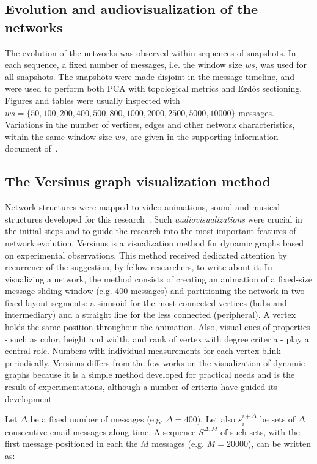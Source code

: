 \subsection{Evolution and audiovisualization of the networks}\label{sec:viz}
The evolution of the networks was observed within 
sequences of snapshots. In each sequence, a fixed number of messages,
i.e. the window size $ws$, was used for all snapshots.
The snapshots were made disjoint in the message timeline, and were used to perform both PCA with topological metrics and Erd\"os sectioning. 
Figures and tables were usually inspected with 
$ws=\{50, 100, 200, 400, 500, 800, 1000, 2000, 2500, 5000, 10000\}$ messages. Variations in the number of vertices, edges
and other network characteristics, within the same window size $ws$,
are given in the supporting information document of~\cite{stab}. 

\subsection{The Versinus graph visualization method}
Network structures were mapped to video animations, sound and musical structures developed for this research~\cite{animacoes}.%
Such \emph{audiovisualizations} were crucial in the initial steps and
to guide the research into the most important features of network evolution.
Versinus is a visualization method for dynamic graphs based on experimental observations.
This method received dedicated attention by recurrence of the suggestion, by fellow researchers,
to write about it. 
In visualizing a network, the method consists of creating an animation
of a fixed-size message sliding window (e.g. 400 messages) and 
partitioning the network in two fixed-layout segments:
a sinusoid for the most connected vertices (hubs and intermediary)
and a straight line for the less connected (peripheral).
A vertex holds the same position throughout the animation. Also,
visual cues of properties - such as color, height and width,
and rank of vertex with degree criteria - play a central role.
Numbers with individual measurements for each vertex blink periodically.
Versinus differs from the few works on the visualization of dynamic
graphs because it is a simple method developed for practical needs and is the result of experimentations,
although a number of criteria have guided its development~\cite{Viz1,Viz2,Viz3}.

Let $\Delta$ be a fixed number of messages (e.g. $\Delta=400$).
Let also $s_{i}^{i+\Delta}$ be sets of $\Delta$ consecutive email messages along time.
A sequence $S^{\Delta,M}$ of such sets,
with the first message positioned in each the $M$ messages (e.g. $M=20000$),
can be written as: 

